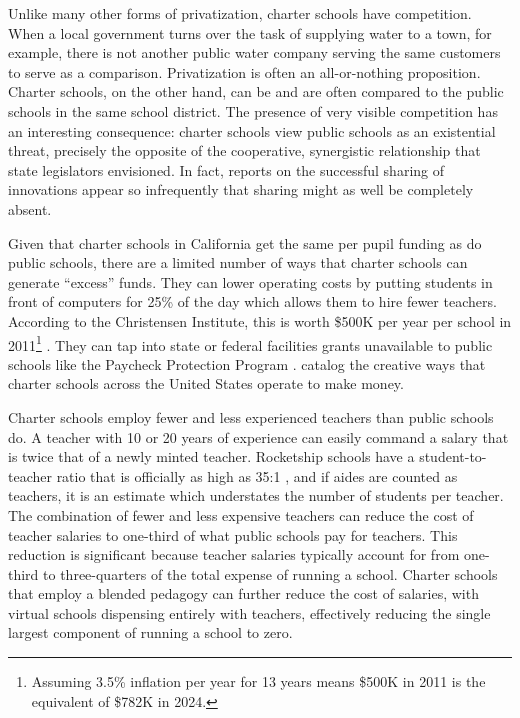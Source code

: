 Unlike many other forms of privatization, charter schools have competition. When a local government turns over the task of supplying water to a town, for example, there is not another public water company serving the same customers to serve as a comparison. Privatization is often an all-or-nothing proposition. Charter schools, on the other hand, can be and are often compared to the public schools in the same school district. The presence of very visible competition has an interesting consequence: charter schools view public schools as an existential threat, precisely the opposite of the cooperative, synergistic relationship that state legislators envisioned. In fact, reports on the successful sharing of innovations appear so infrequently that sharing might as well be completely absent. 

Given that charter schools in California get the same per pupil funding as do public schools, there are a limited number of ways that charter schools can generate ``excess'' funds. They can lower operating costs by putting students in front of computers for 25\% of the day which allows them to hire fewer teachers. According to the Christensen Institute, this is worth \$500K per year per school in 2011\footnote{Assuming 3.5\% inflation per year for 13 years means \$500K in 2011 is the equivalent of \$782K in 2024.} \parencite{ChristensenInstitute2011}. They can tap into state or federal facilities grants unavailable to public schools like the Paycheck Protection Program \parencite[18]{RSEA2020}. \textcite{Baker.Miron2015} catalog the creative ways that charter schools across the United States operate to make money.

Charter schools employ fewer and less experienced teachers than public schools do. A teacher with 10 or 20 years of experience can easily command a salary that is twice that of a newly minted teacher. Rocketship schools have a student-to-teacher ratio that is officially as high as 35:1 \parencite[44]{SCCOE2023}, and if aides are counted as teachers, it is an estimate which understates the number of students per teacher. The combination of fewer and less expensive teachers can reduce the cost of teacher salaries to one-third of what public schools pay for teachers. This reduction is significant because teacher salaries typically account for from one-third to three-quarters of the total expense of running a school. Charter schools that employ a blended pedagogy can further reduce the cost of salaries, with virtual schools dispensing entirely with teachers, effectively reducing the single largest component of running a school to zero.

